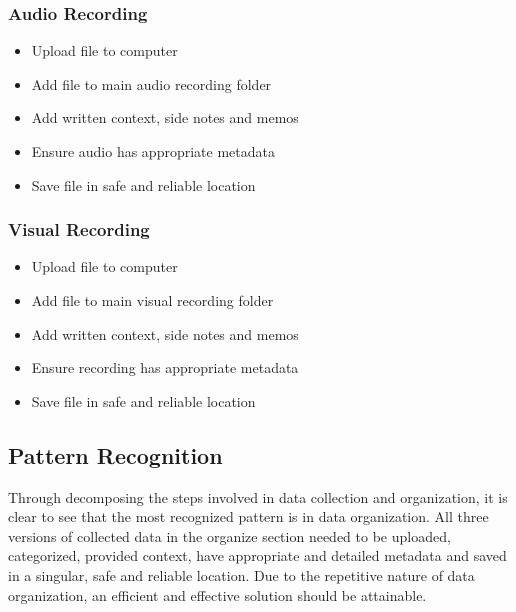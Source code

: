 \documentclass{article}
\begin{document}
\subsubsection{Audio Recording}
\begin{itemize}
\item Upload file to computer
\item Add file to main audio recording folder
\item Add written context, side notes and memos
\item Ensure audio has appropriate metadata
\item Save file in safe and reliable location
\end{itemize}

\subsubsection{Visual Recording}
\begin{itemize}
\item Upload file to computer
\item Add file to main visual recording folder
\item Add written context, side notes and memos
\item Ensure recording has appropriate metadata 
\item Save file in safe and reliable location
\end{itemize}

\subsection{Pattern Recognition}
Through decomposing the steps involved in data collection and organization, it is clear to see that the most recognized pattern is in data organization. All three versions of collected data in the organize section needed to be uploaded, categorized, provided context, have appropriate  and detailed metadata and saved in a singular, safe and reliable location. Due to the repetitive nature of data organization, an efficient and effective solution should be attainable. 
\end{document}
